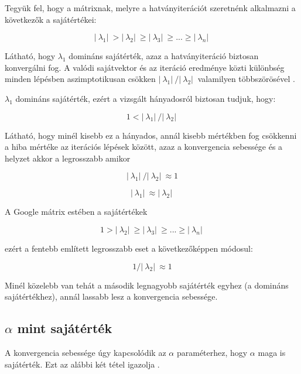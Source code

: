 \documentclass[12pt,a4paper]{article}
\begin{document}
Tegyük fel, hogy a mátrixnak, melyre a hatványiterációt szeretnénk alkalmazni a következők a sajátértékei:

\[ |\ \lambda_1 |\ > |\ \lambda_2 |\ \geq |\ \lambda_3 |\ \geq ... \geq |\ \lambda_n |\ \] 

Látható, hogy $\lambda_1$ domináns sajátérték, azaz a hatványiteráció biztosan konvergálni fog. A valódi sajátvektor és az iteráció eredménye közti különbség minden lépésben aszimptotikusan csökken $ |\ \lambda_1 |\ / |\ \lambda_2 |\ $ valamilyen többszörösével \cite{poweriteration}.

$\lambda_1$ domináns sajátérték, ezért a vizsgált hányadosról biztosan tudjuk, hogy:

\[ 1 < |\ \lambda_1 |\ / |\ \lambda_2 |\ \]

Látható, hogy minél kisebb ez a hányados, annál kisebb mértékben fog csökkenni a hiba mértéke az iterációs lépések között, azaz a konvergencia sebessége és a helyzet akkor a legrosszabb amikor

\[ |\ \lambda_1 |\ / |\ \lambda_2 |\ \approx 1 \]

\[ |\ \lambda_1 |\ \approx |\ \lambda_2 |\ \]

A Google mátrix estében a sajátértékek

\[ 1 > |\ \lambda_2 |\ \geq |\ \lambda_3 |\ \geq ... \geq |\ \lambda_n |\ \]

ezért a fentebb említett legrosszabb eset a következőképpen módosul:

\[ 1 / |\ \lambda_2 |\ \approx 1 \]

Minél közelebb van tehát a második legnagyobb sajátérték egyhez (a domináns sajátértékhez), annál lassabb lesz a konvergencia sebessége.

\subsection{$\alpha$ mint sajátérték}

A konvergencia sebessége úgy kapcsolódik az $\alpha$ paraméterhez, hogy $\alpha$ maga is sajátérték. Ezt az alábbi két tétel igazolja \cite{secondeigenvalue}. 
\end{document}
